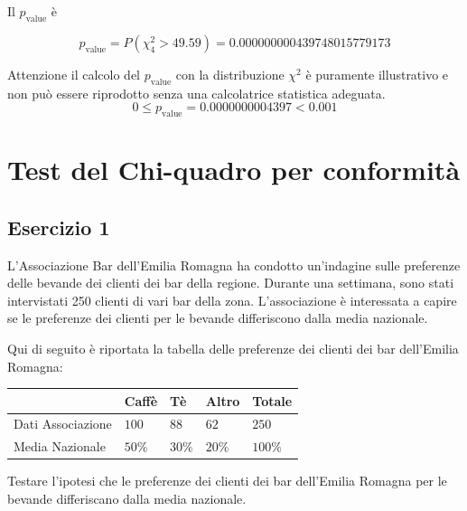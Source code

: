 \documentclass[
  11pt,
]{book}
\theoremstyle{mytheoremstyle}
\theoremstyle{mydefstyle}
\newenvironment{sol}
  {
  \begin{tcolorbox}[enhanced,breakable,arc=0.1mm,boxrule=1pt,colback=white,colframe=iblue,
  title=\bf \fontfamily{lmss}\selectfont \hspace{.5 cm} Soluzione,drop fuzzy shadow]

}{
\end{tcolorbox}
  }
\begin{document}
\begin{sol}
Il \(p_{\text{value}}\) è

\[ p_{\text{value}} = P(\chi^2_{4}>49.59)=0.000000000439748015779173 \]

Attenzione il calcolo del \(p_\text{value}\) con la distribuzione \(\chi^2\) è puramente illustrativo e non può essere riprodotto senza una calcolatrice statistica adeguata.\[
 0 \leq p_\text{value}= 0.0000000004397 < 0.001 
\]

\end{sol}

\chapter{Test del Chi-quadro per conformità}\label{test-del-chi-quadro-per-conformituxe0}

\section{Esercizio 1}\label{esercizio-1-1}

L'Associazione Bar dell'Emilia Romagna ha condotto un'indagine sulle preferenze delle bevande dei clienti dei bar della regione. Durante una settimana, sono stati intervistati 250 clienti di vari bar della zona. L'associazione è interessata a capire se le preferenze dei clienti per le bevande differiscono dalla media nazionale.

Qui di seguito è riportata la tabella delle preferenze dei clienti dei bar dell'Emilia Romagna:

\begin{table}[H]
\centering
\begin{tabular}{lllll}
\toprule
  & Caffè & Tè & Altro & Totale\\
\midrule
Dati Associazione & $100$ & $88$ & $62$ & $250$\\
Media Nazionale & $50\%$ & $30\%$ & $20\%$ & $100\%$\\
\bottomrule
\end{tabular}
\end{table}

Testare l'ipotesi che le preferenze dei clienti dei bar dell'Emilia Romagna per le bevande differiscano dalla media nazionale.
\end{document}
